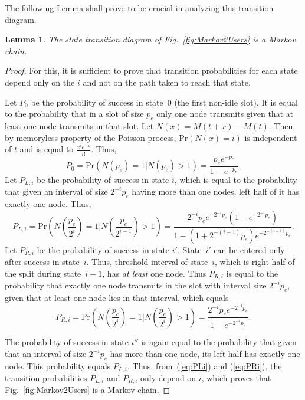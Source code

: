 \documentclass[12pt,draftcls,peerreview, onecolumn]{IEEEtran}
\newtheorem{lemma}{{\bf Lemma}}
\newcommand{\eqn}[1]{(\ref{#1})}
\newcommand{\brac}[1]{\left({#1}\right)}
\newcommand{\prob}[1]{\text{Pr}\brac{#1}}
\newcommand{\PLi}[1]{P_{L,#1}}
\newcommand{\PRi}[1]{P_{R,#1}}
\begin{document}
The following Lemma shall prove to be crucial in analyzing this
transition diagram.
\begin{lemma}
The state transition diagram of Fig.~\ref{fig:Markov2Users} is a Markov chain.
\label{lem:markov2users}
\end{lemma}
\begin{proof}
For this, it is sufficient to prove that transition probabilities for each state depend only on the $i$ and not on
the path taken to reach that state.

Let $ P_{0}$ be the probability of success in state~$0$ (the first
non-idle slot). It is equal to the probability that in a slot of size
$p_e$ only one node transmits given that at least one node transmits
in that slot. Let $N(x)=M(t+x)-M(t)$. Then, by memoryless property of
the Poisson process, $\prob{N(x)=i}$ is independent of $t$ and is equal to
$\frac{x^i e^{-x}}{i!}$. Thus,
 \begin{equation}
 P_0= \prob{N(p_e)=1 \Big| N(p_e) > 1}
    =\frac{p_e e^{-p_e}}{1-e^{-p_e}}.
 \end{equation}
Let $\PLi{i}$ be the probability of success in state $i$, which is equal to the probability
that given an interval of size $2^{-i}p_e$
having more than one nodes, left half of it has exactly one node.  Thus,
 \begin{equation}\label{eq:PLi}
 \PLi{i}= \prob{N\left(\frac{p_e}{2^{i}}\right)=1 \Big| N\left(\frac{p_e}{2^{i-1}}\right) > 1}
             = \frac{2^{-i}p_ee^{-2^{-i}p_e}(1-e^{-2^{-i}p_e})}{1-(1+2^{-(i-1)}p_e)e^{-2^{-(i-1)}p_e}}.
 \end{equation}
Let $\PRi{i}$ be the probability of success in state $i'$. State~$i'$
 can be entered only after success in state~$i$. Thus, threshold
 interval of state~$i$, which is right half of the split during
 state~$i-1$, has {\it at least} one node. Thus $\PRi{i}$ is equal to
 the probability that exactly one node transmits in the slot with
 interval size $2^{-i}p_e$, given that at least one node lies in that
 interval, which equals
 \begin{equation}
 \PRi{i}= \prob{N\left(\frac{p_e}{2^{i}}\right)=1 \Big| N\left(\frac{p_e}{2^{i}}\right) > 1}
             = \frac{2^{-i}p_ee^{-2^{-i}p_e}}{1-e^{-2^{-i}p_e}}.
\label{eq:PRi}
 \end{equation}

 The probability of success in state $i''$ is again equal to the
 probability that given that an interval of size $2^{-i}p_e$ has more
 than one node, its left half has exactly one node. This probability
 equals $\PLi{i}$. Thus, from~\eqn{eq:PLi} and \eqn{eq:PRi}, the
 transition probabilities $\PLi{i}$ and $\PRi{i}$ only depend on $i$,
 which proves that Fig.~\ref{fig:Markov2Users} is a Markov chain.
\end{proof}
\end{document}

